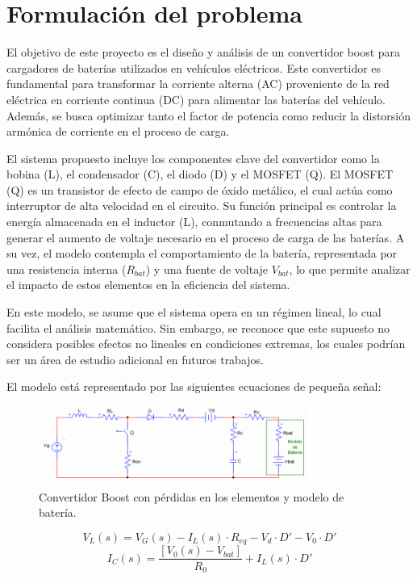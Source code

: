 \section{Formulación del problema}
El objetivo de este proyecto es el diseño y análisis de un convertidor boost para cargadores de baterías
utilizados en vehículos eléctricos. Este convertidor es fundamental para transformar la corriente
alterna (AC) proveniente de la red eléctrica en corriente continua (DC) para alimentar las baterías del
vehículo. Además, se busca optimizar tanto el factor de potencia como reducir la distorsión armónica
de corriente en el proceso de carga.

El sistema propuesto incluye los componentes clave del convertidor como la bobina (L), el
condensador (C), el diodo (D) y el MOSFET (Q). El MOSFET (Q) es un transistor de efecto de
campo de óxido metálico, el cual actúa como interruptor de alta velocidad en el circuito. Su función
principal es controlar la energía almacenada en el inductor (L), conmutando a frecuencias altas para
generar el aumento de voltaje necesario en el proceso de carga de las baterías. A su vez, el modelo
contempla el comportamiento de la batería, representada por una resistencia interna (\(R_{bat}\)) y una
fuente de voltaje \(V_{bat}\), lo que permite analizar el impacto de estos elementos en la eficiencia del
sistema.

En este modelo, se asume que el sistema opera en un régimen lineal, lo cual facilita el análisis
matemático. Sin embargo, se reconoce que este supuesto no considera posibles efectos no lineales en
condiciones extremas, los cuales podrían ser un área de estudio adicional en futuros trabajos.

El modelo está representado por las siguientes ecuaciones de pequeña señal:

\begin{figure}[h]
	\centering
	\includegraphics[width=0.8\textwidth]{1.png} %
	\caption{Convertidor Boost con pérdidas en los elementos y modelo de batería.}
	\label{fig:convertidor}
\end{figure}

\[V_L(s) = V_G(s) - I_L(s) \cdot R_{eq} - V_d \cdot D' - V_0 \cdot D'\]
\[I_C(s) = \frac{[V_0(s) - V_{bat}]}{R_0} + I_L(s) \cdot D'\]

